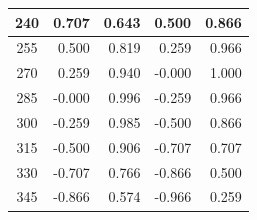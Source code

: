 \begin{table}[htbp]
\begin{center}
\begin{tabular}{|p{20mm}|p{20mm}|p{20mm}|p{20mm}|p{20mm}|}
      \multicolumn{1}{|c|}{240}                      & \multicolumn{1}{|r|}{0.707}                                  & \multicolumn{1}{|r|}{0.643}                                  & \multicolumn{1}{|r|}{0.500}                & \multicolumn{1}{|r|}{0.866}                \\ \hline
      \multicolumn{1}{|c|}{255}                      & \multicolumn{1}{|r|}{0.500}                                  & \multicolumn{1}{|r|}{0.819}                                  & \multicolumn{1}{|r|}{0.259}                & \multicolumn{1}{|r|}{0.966}                \\ \hline
      \multicolumn{1}{|c|}{270}                      & \multicolumn{1}{|r|}{0.259}                                  & \multicolumn{1}{|r|}{0.940}                                  & \multicolumn{1}{|r|}{-0.000}               & \multicolumn{1}{|r|}{1.000}                \\ \hline
      \multicolumn{1}{|c|}{285}                      & \multicolumn{1}{|r|}{-0.000}                                 & \multicolumn{1}{|r|}{0.996}                                  & \multicolumn{1}{|r|}{-0.259}               & \multicolumn{1}{|r|}{0.966}                \\ \hline
      \multicolumn{1}{|c|}{300}                      & \multicolumn{1}{|r|}{-0.259}                                 & \multicolumn{1}{|r|}{0.985}                                  & \multicolumn{1}{|r|}{-0.500}               & \multicolumn{1}{|r|}{0.866}                \\ \hline
      \multicolumn{1}{|c|}{315}                      & \multicolumn{1}{|r|}{-0.500}                                 & \multicolumn{1}{|r|}{0.906}                                  & \multicolumn{1}{|r|}{-0.707}               & \multicolumn{1}{|r|}{0.707}                \\ \hline
      \multicolumn{1}{|c|}{330}                      & \multicolumn{1}{|r|}{-0.707}                                 & \multicolumn{1}{|r|}{0.766}                                  & \multicolumn{1}{|r|}{-0.866}               & \multicolumn{1}{|r|}{0.500}                \\ \hline
      \multicolumn{1}{|c|}{345}                      & \multicolumn{1}{|r|}{-0.866}                                 & \multicolumn{1}{|r|}{0.574}                                  & \multicolumn{1}{|r|}{-0.966}               & \multicolumn{1}{|r|}{0.259}                \\ \hline
    \end{tabular}
  \end{center}
\end{table}


